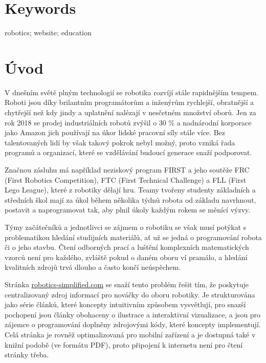 \documentclass[a4paper, 12pt]{article}
\begin{document}
  \section*{\normalfont\textbf{Keywords}}
  robotics; website; education

  \newpage

  \setcounter{savepage}{\value{page}}%

  \renewcommand{\contentsname}{Obsah}
  \tableofcontents

  \newpage

  \section{Úvod}
  V dnešním světě plným technologií se robotika rozvíjí stále rapidnějším tempem. Roboti jsou díky brilantním programátorům a inženýrům rychlejší, obratnější a chytřejší než kdy jindy a uplatnění nalézají v nesčetném množství oborů. Jen za rok 2018 se prodej industriálních robotů zvýšil o 30 \%\cite{industrial-robot-growth} a nadnárodní korporace jako Amazon jich používají na úkor lidské pracovní síly stále více\cite{amazon-hiring}. Bez talentovaných lidí by však takový pokrok nebyl možný, proto vzniká řada programů a organizací, které se vzdělávání budoucí generace snaží podporovat.

  Značnou zásluhu má například neziskový program FIRST\cite{first-inspires} a jeho soutěže FRC (First Robotics Competition), FTC (First Technical Challenge) a FLL (First Lego League), které z robotiky dělají hru. Teamy tvořeny studenty základních a středních škol mají za úkol během několika týdnů robota od základu navrhnout, postavit a naprogramovat tak, aby plnil úkoly každým rokem se měnící výzvy.

  Týmy začátečníků a jednotlivci se zájmem o robotiku se však musí potýkat s problematikou hledání studijních materiálů, ať už se jedná o programování robota či o jeho stavbu. Čtení odborných prací a luštění komplexních matematických vzorců není pro každého, zvláště pokud o daném oboru ví pramálo, a hledání kvalitních zdrojů trvá dlouho a často končí neúspěchem.

  Stránka \url{robotics-simplified.com} se snaží tento problém řešit tím, že poskytuje centralizovaný zdroj informací pro nováčky do oboru robotiky. Je strukturována jako série článků, které koncepty intuitivním způsobem vysvětlují, pro snazší pochopení jsou články obohaceny o ilustrace a interaktivní vizualizace, a jsou pro zájemce o programování doplněny zdrojovými kódy, které koncepty implementují. Celá stránka je rovněž optimalizovaná pro mobilní zařízení a je dostupná také v knižní podobě (ve formátu PDF), proto připojení k internetu není pro čtení stránky třeba.
\end{document}
